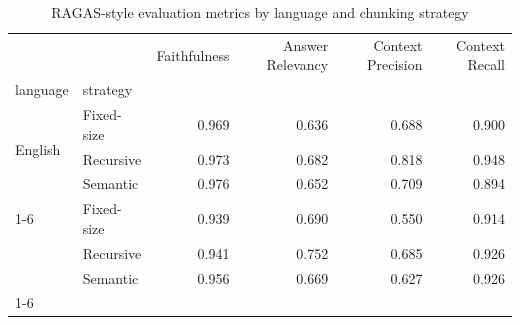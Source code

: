 \begin{table}
\caption{RAGAS-style evaluation metrics by language and chunking strategy}
\label{tab:results}
\begin{tabular}{llrrrr}
\toprule
 &  & Faithfulness & Answer Relevancy & Context Precision & Context Recall \\
language & strategy &  &  &  &  \\
\midrule
\multirow[t]{3}{*}{English} & Fixed-size & 0.969 & 0.636 & 0.688 & 0.900 \\
 & Recursive & 0.973 & 0.682 & 0.818 & 0.948 \\
 & Semantic & 0.976 & 0.652 & 0.709 & 0.894 \\
\cline{1-6}
\multirow[t]{3}{*}{Tamil} & Fixed-size & 0.939 & 0.690 & 0.550 & 0.914 \\
 & Recursive & 0.941 & 0.752 & 0.685 & 0.926 \\
 & Semantic & 0.956 & 0.669 & 0.627 & 0.926 \\
\cline{1-6}
\bottomrule
\end{tabular}
\end{table}
